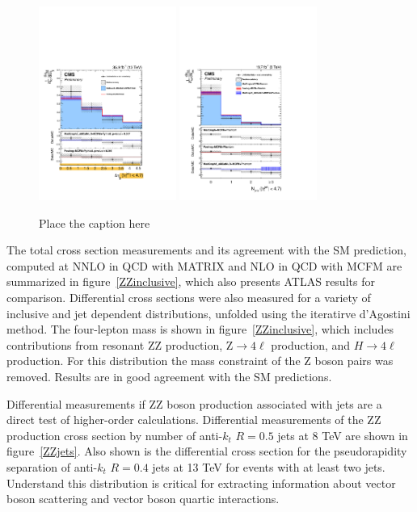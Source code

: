 \documentclass[10pt]{article}
\begin{document}
\begin{figure}[htb]
  \centering
    \includegraphics[height=2.5in]{figures/ZZ_13TeV_dEtajj_unfolded.pdf}
    \includegraphics[height=2.5in]{figures/ZZ_8TeV_nJets_unfolded.pdf}
  \caption{ Place the caption here}
  \label{fig:ZZjets}
\end{figure}
The total cross section measurements and its agreement with the SM
prediction, computed at NNLO in QCD with MATRIX and NLO in QCD with MCFM
are summarized in figure~\ref{ZZinclusive}, which also presents ATLAS results for comparison. 
Differential cross sections were also measured for a variety of inclusive 
and jet dependent distributions, unfolded using the iteratirve d'Agostini method. 
The four-lepton mass is shown in figure~\ref{ZZinclusive}, which includes contributions 
from resonant ZZ production, Z$\rightarrow 4\ell$ production, and $H \rightarrow 4\ell$ production. 
For this distribution the mass constraint of the Z boson pairs was removed.
Results are in good agreement with the SM predictions.

Differential measurements if ZZ boson production associated with jets are
a direct test of higher-order calculations. Differential measurements of 
the ZZ production cross section by number of anti-$k_{t}$ $R=0.5$ jets 
at 8 TeV are shown in figure~\ref{ZZjets}. Also shown is the differential
cross section for the pseudorapidity separation of
anti-$k_{t}$ $R=0.4$ jets at 13 TeV for events with at least two jets.
Understand this distribution is critical for extracting information
about vector boson scattering and vector boson quartic interactions.
\end{document}
